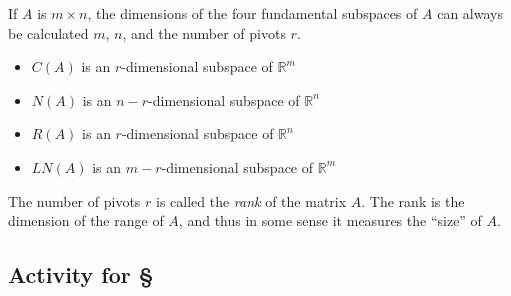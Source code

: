 \documentclass[11pt,oneside]{amsbook}
\newcommand{\R}{\mathbb R}
\theoremstyle{definition}
\theoremstyle{plain}
\theoremstyle{definition}
\theoremstyle{remark}
\numberwithin{equation}{section}
\numberwithin{figure}{section}
\begin{document}
If $A$ is $m\times n$, the dimensions of the four fundamental subspaces of $A$ can always be calculated $m$, $n$, and the number of pivots $r$.
\begin{itemize}
  \item $C(A)$ is an $r$-dimensional subspace of $\R^m$
  \item $N(A)$ is an $n-r$-dimensional subspace of $\R^n$
  \item $R(A)$ is an $r$-dimensional subspace of $\R^n$
  \item $LN(A)$ is an $m-r$-dimensional subspace of $\R^m$
\end{itemize}
The number of pivots $r$ is called the \emph{rank} of the matrix $A$. The rank is the dimension of the range of $A$, and thus in some sense it measures the ``size'' of $A$.

\newpage
\subsection*{Activity for \S \thesection}
\end{document}
